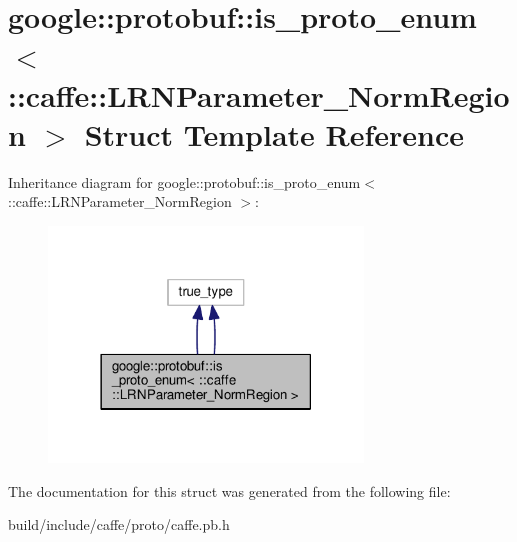 \hypertarget{structgoogle_1_1protobuf_1_1is__proto__enum_3_01_1_1caffe_1_1_l_r_n_parameter___norm_region_01_4}{}\section{google\+:\+:protobuf\+:\+:is\+\_\+proto\+\_\+enum$<$ \+:\+:caffe\+:\+:L\+R\+N\+Parameter\+\_\+\+Norm\+Region $>$ Struct Template Reference}
\label{structgoogle_1_1protobuf_1_1is__proto__enum_3_01_1_1caffe_1_1_l_r_n_parameter___norm_region_01_4}


Inheritance diagram for google\+:\+:protobuf\+:\+:is\+\_\+proto\+\_\+enum$<$ \+:\+:caffe\+:\+:L\+R\+N\+Parameter\+\_\+\+Norm\+Region $>$\+:
\nopagebreak
\begin{figure}[H]
\begin{center}
\leavevmode
\includegraphics[width=237pt]{structgoogle_1_1protobuf_1_1is__proto__enum_3_01_1_1caffe_1_1_l_r_n_parameter___norm_region_01_4__inherit__graph}
\end{center}
\end{figure}


The documentation for this struct was generated from the following file\+:\begin{DoxyCompactItemize}
\item 
build/include/caffe/proto/caffe.\+pb.\+h\end{DoxyCompactItemize}
